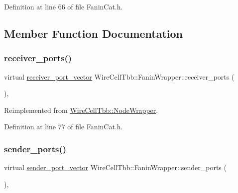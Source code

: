 Definition at line 66 of file Fanin\+Cat.\+h.



\subsection{Member Function Documentation}
\mbox{\label{class_wire_cell_tbb_1_1_fanin_wrapper_a9aa4c230eacef36c2ebbb26fe34412c4}} 
\subsubsection{\texorpdfstring{receiver\+\_\+ports()}{receiver\_ports()}}
{\footnotesize\ttfamily virtual \hyperlink{namespace_wire_cell_tbb_a87f42fe8a3ccc3bf9d315cb2d252c7af}{receiver\+\_\+port\+\_\+vector} Wire\+Cell\+Tbb\+::\+Fanin\+Wrapper\+::receiver\+\_\+ports (\begin{DoxyParamCaption}{ }\end{DoxyParamCaption})\hspace{0.3cm}{\ttfamily [inline]}, {\ttfamily [virtual]}}



Reimplemented from \hyperlink{class_wire_cell_tbb_1_1_node_wrapper_ac3c636904e4d3d1df0939906dd8853c7}{Wire\+Cell\+Tbb\+::\+Node\+Wrapper}.



Definition at line 77 of file Fanin\+Cat.\+h.

\mbox{\label{class_wire_cell_tbb_1_1_fanin_wrapper_a03e6bbc3d8adc82c6203a72d615c1ba7}} 
\subsubsection{\texorpdfstring{sender\+\_\+ports()}{sender\_ports()}}
{\footnotesize\ttfamily virtual \hyperlink{namespace_wire_cell_tbb_a99272fef0f0c33dc9d4e6e8f777b2e6e}{sender\+\_\+port\+\_\+vector} Wire\+Cell\+Tbb\+::\+Fanin\+Wrapper\+::sender\+\_\+ports (\begin{DoxyParamCaption}{ }\end{DoxyParamCaption})\hspace{0.3cm}{\ttfamily [inline]}, {\ttfamily [virtual]}}




